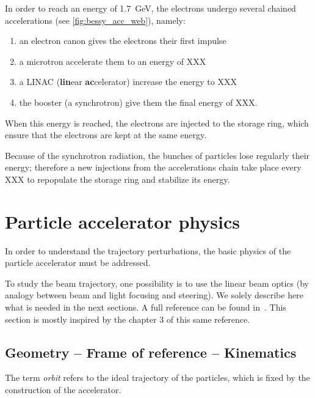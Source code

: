 In order to reach an energy of 1.7~GeV, the electrons undergo several chained accelerations (see \autoref{fig:bessy_acc_web}), namely:
\begin{enumerate}
    \item an electron canon gives the electrons their first impulse
    \item a microtron accelerate them to an energy of XXX
    \item a LINAC (\textbf{lin}ear \textbf{ac}celerator) increase the energy to XXX
    \item the booster (a synchrotron) give them the final energy of XXX.
\end{enumerate}

When this energy is reached, the electrons are injected to the storage ring, which ensure that the electrons are kept at the same energy.

Because of the synchrotron radiation, the bunches of particles lose regularly their energy; therefore a new injections from the accelerations chain take place every XXX to repopulate the storage ring and stabilize its energy.

\section{Particle accelerator physics}
In order to understand the trajectory perturbations, the basic physics of the particle accelerator must be addressed.

To study the beam trajectory, one possibility is to use the linear beam optics (by analogy between beam and light focusing and steering). We solely describe here what is needed in the next sections. A full reference can be found in~\cite{book:wille}. This section is mostly inspired by the chapter 3 of this same reference.

\subsection{Geometry -- Frame of reference -- Kinematics}
The term \emph{orbit} refers to the ideal trajectory of the particles, which is fixed by the construction of the accelerator.

